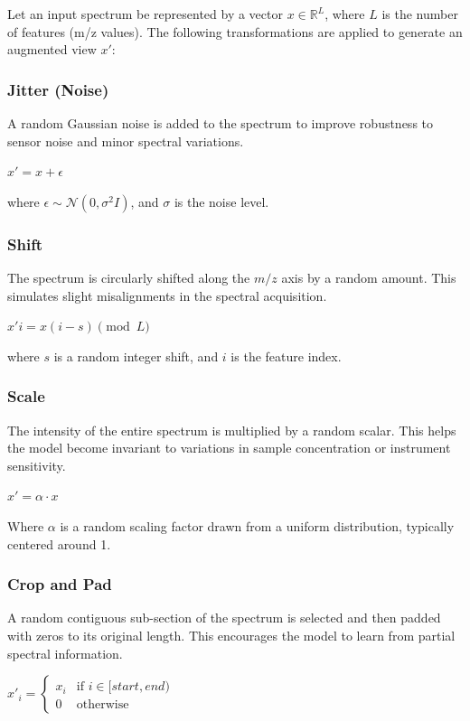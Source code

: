 Let an input spectrum be represented by a vector $x \in \mathbb{R}^L$, where $L$ is the number of
features (m/z values). The following transformations are applied to generate an augmented view $x'$:

\subsubsection{Jitter (Noise)}

A random Gaussian noise is added to the spectrum to improve robustness to sensor noise and minor spectral variations.

$x' = x + \epsilon$


\noindent where $\epsilon \sim \mathcal{N}(0, \sigma^2 I)$, and $\sigma$ is the noise level.

\subsubsection{Shift}

The spectrum is circularly shifted along the $m/z$ axis by a random amount. This simulates slight misalignments in the
spectral acquisition.

$x'i = x{(i-s) \pmod L}$


\noindent where $s$ is a random integer shift, and $i$ is the feature index.

\subsubsection{Scale}

The intensity of the entire spectrum is multiplied by a random scalar. This helps the model become invariant to
variations in sample concentration or instrument sensitivity.

$x' = \alpha \cdot x$


\noindent Where $\alpha$ is a random scaling factor drawn from a uniform distribution, typically centered around 1.

\subsubsection{Crop and Pad}

A random contiguous sub-section of the spectrum is selected and then padded with zeros to its original length. This
encourages the model to learn from partial spectral information.


$x'_i = \begin{cases} x_i & \text{if } i \in [start, end) \\ 0 & \text{otherwise} \end{cases}$

